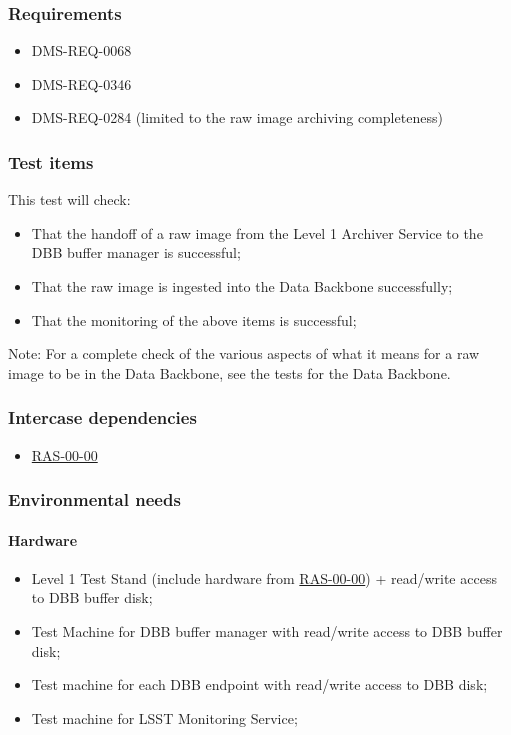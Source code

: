 \documentclass[DM,lsstdraft,STS,toc]{lsstdoc}
\begin{document}
\subsubsection{Requirements}


\begin{itemize}
\item{DMS-REQ-0068}
\item{DMS-REQ-0346}
\item{DMS-REQ-0284 (limited to the raw image archiving completeness)}
\end{itemize}


\subsubsection{Test items}


This test will check:
\begin{itemize}
\item{That the handoff of a raw image from the Level 1 Archiver Service to the DBB buffer
manager is successful;}
\item{That the raw image is ingested into the Data Backbone successfully;}
\item{That the monitoring of the above items is successful;}
\end{itemize}


Note: For a complete check of the various aspects of what it means for
a raw image to be in the Data Backbone, see the tests for the Data Backbone.

\subsubsection{Intercase dependencies}
\begin{itemize}
\item{\hyperref[ras-00-00]{RAS-00-00}}
\end{itemize}


\subsubsection{Environmental needs}
\paragraph{Hardware}
\begin{itemize}
\item{Level 1 Test Stand (include hardware from \hyperref[ras-00-00]{RAS-00-00}) + read/write access to DBB buffer disk;}
\item{Test Machine for DBB buffer manager with read/write access to DBB buffer disk;}
\item{Test machine for each DBB endpoint with read/write access to DBB disk;}
\item{Test machine for LSST Monitoring Service;}
\end{itemize}
\end{document}
